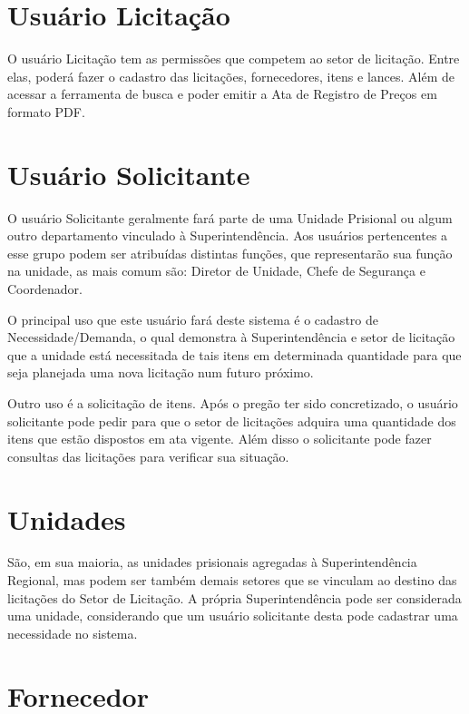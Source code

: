\documentclass[ ]{article}
\begin{document}
\section{Usuário Licitação}
	O usuário Licitação tem as permissões que competem ao setor de licitação. Entre elas, poderá fazer o cadastro das licitações, fornecedores, itens e lances. Além de acessar a ferramenta de busca e poder emitir a Ata de Registro de Preços em formato PDF.

\section{Usuário Solicitante}
	O usuário Solicitante geralmente fará parte de uma Unidade Prisional ou algum outro departamento vinculado à Superintendência. Aos usuários pertencentes a esse grupo podem ser atribuídas distintas funções, que representarão sua função na unidade, as mais comum são: Diretor de Unidade, Chefe de Segurança e Coordenador.
	
	O principal uso que este usuário fará deste sistema é o cadastro de Necessidade/Demanda, o qual demonstra à Superintendência e setor de licitação que a unidade está necessitada de tais itens em determinada quantidade para que seja planejada uma nova licitação num futuro próximo.
	
	Outro uso é a solicitação de itens. Após o pregão ter sido concretizado, o usuário solicitante pode pedir para que o setor de licitações adquira uma quantidade dos itens que estão dispostos em ata vigente. Além disso o solicitante pode fazer consultas das licitações para verificar sua situação.

\section{Unidades}
	São, em sua maioria, as unidades prisionais agregadas à Superintendência Regional, mas podem ser também demais setores que se vinculam ao destino das licitações do Setor de Licitação. A própria Superintendência pode ser considerada uma unidade, considerando que um usuário solicitante desta pode cadastrar uma necessidade no sistema.

\section{Fornecedor}
		
\end{document}
